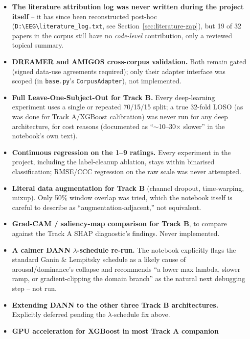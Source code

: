 \documentclass[11pt]{report}
\begin{document}
\begin{itemize}
  \item \textbf{The literature attribution log was never written during the
        project itself} -- it has since been reconstructed
        post-hoc (\texttt{D:\textbackslash EEG\textbackslash literature\_log.txt}, see
        Section~\ref{sec:literature-gap}), but 19 of 32 papers in the corpus
        still have no \emph{code-level} contribution, only a reviewed
        topical summary.
  \item \textbf{DREAMER and AMIGOS cross-corpus validation.} Both remain
        gated (signed data-use agreements required); only their adapter
        interface was scoped (in \texttt{base.py}'s \texttt{CorpusAdapter}),
        not implemented.
  \item \textbf{Full Leave-One-Subject-Out for Track B.} Every deep-learning
        experiment uses a single or repeated 70/15/15 split; a true 32-fold
        LOSO (as was done for Track A/XGBoost calibration) was never run for
        any deep architecture, for cost reasons (documented as ``$\sim$10--30$\times$
        slower'' in the notebook's own text).
  \item \textbf{Continuous regression on the 1--9 ratings.} Every experiment
        in the project, including the label-cleanup ablation, stays within
        binarised classification; RMSE/CCC regression on the raw scale was
        never attempted.
  \item \textbf{Literal data augmentation for Track B} (channel dropout,
        time-warping, mixup). Only 50\% window overlap was tried, which the
        notebook itself is careful to describe as ``augmentation-adjacent,''
        not equivalent.
  \item \textbf{Grad-CAM / saliency-map comparison for Track B}, to compare
        against the Track A SHAP diagnostic's findings. Never implemented.
  \item \textbf{A calmer DANN $\lambda$-schedule re-run.} The notebook
        explicitly flags the standard Ganin \& Lempitsky schedule as a
        likely cause of arousal/dominance's collapse and recommends
        ``a lower max lambda, slower ramp, or gradient-clipping the domain
        branch'' as the natural next debugging step -- not run.
  \item \textbf{Extending DANN to the other three Track B architectures.}
        Explicitly deferred pending the $\lambda$-schedule fix above.
  \item \textbf{GPU acceleration for XGBoost in most Track A companion
}
\end{itemize}
\end{document}
